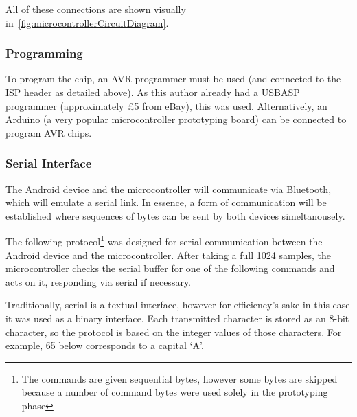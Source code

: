 All of these connections are shown visually
in~\cref{fig:microcontrollerCircuitDiagram}.

\subsubsection{Programming}

To program the chip, an AVR programmer must be used (and connected to the ISP
header as detailed above). As this author already had a USBASP programmer
(approximately \pounds 5 from eBay), this was used. Alternatively, an Arduino (a
very popular microcontroller prototyping board) can be connected to program AVR
chips.

\subsubsection{Serial Interface}

The Android device and the microcontroller will communicate via Bluetooth, which
will emulate a serial link. In essence, a form of communication will be
established where sequences of bytes can be sent by both devices simeltanousely.

The following protocol\footnote{The commands are given sequential bytes, however
some bytes are skipped because a number of command bytes were used solely in the
prototyping phase} was designed for serial communication between the Android
device and the microcontroller. After taking a full 1024 samples, the
microcontroller checks the serial buffer for one of the following commands and
acts on it, responding via serial if necessary.

Traditionally, serial is a textual interface, however for efficiency's sake in
this case it was used as a binary interface. Each transmitted character is
stored as an 8-bit character, so the protocol is based on the integer values of
those characters. For example, 65 below corresponds to a capital `A'.

